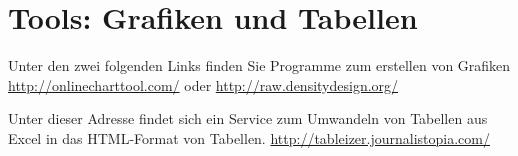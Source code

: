 \documentclass[12pt,a4paper, twosite]{article}
\begin{document}
\section*{Tools: Grafiken und Tabellen}
Unter den zwei folgenden Links finden Sie Programme zum erstellen von Grafiken
\url{http://onlinecharttool.com/} oder \url{http://raw.densitydesign.org/}

Unter dieser Adresse findet sich ein Service zum Umwandeln von Tabellen aus Excel in das HTML-Format von Tabellen.
\url{http://tableizer.journalistopia.com/}
\end{document}
